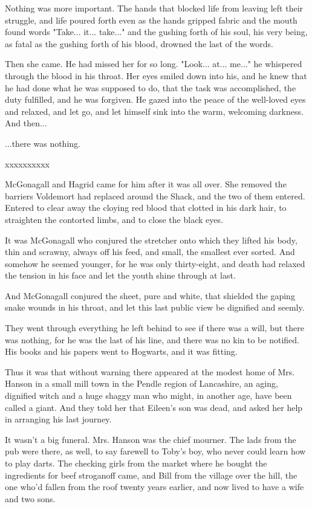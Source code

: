 \documentclass[a4paper,11pt]{article}
\begin{document}
Nothing was more important. The hands that blocked life from leaving left their struggle, and life poured forth even as the hands gripped fabric and the mouth found words "Take... it... take..." and the gushing forth of his soul, his very being, as fatal as the gushing forth of his blood, drowned the last of the words.

Then she came. He had missed her for so long. "Look... at... me..." he whispered through the blood in his throat. Her eyes smiled down into his, and he knew that he had done what he was supposed to do, that the task was accomplished, the duty fulfilled, and he was forgiven. He gazed into the peace of the well-loved eyes and relaxed, and let go, and let himself sink into the warm, welcoming darkness. And then...

...there was nothing.

xxxxxxxxxx

McGonagall and Hagrid came for him after it was all over. She removed the barriers Voldemort had replaced around the Shack, and the two of them entered. Entered to clear away the cloying red blood that clotted in his dark hair, to straighten the contorted limbs, and to close the black eyes.

It was McGonagall who conjured the stretcher onto which they lifted his body, thin and scrawny, always off his feed, and small, the smallest ever sorted. And somehow he seemed younger, for he was only thirty-eight, and death had relaxed the tension in his face and let the youth shine through at last.

And McGonagall conjured the sheet, pure and white, that shielded the gaping snake wounds in his throat, and let this last public view be dignified and seemly.

They went through everything he left behind to see if there was a will, but there was nothing, for he was the last of his line, and there was no kin to be notified. His books and his papers went to Hogwarts, and it was fitting.

Thus it was that without warning there appeared at the modest home of Mrs. Hanson in a small mill town in the Pendle region of Lancashire, an aging, dignified witch and a huge shaggy man who might, in another age, have been called a giant. And they told her that Eileen's son was dead, and asked her help in arranging his last journey.

It wasn't a big funeral. Mrs. Hanson was the chief mourner. The lads from the pub were there, as well, to say farewell to Toby's boy, who never could learn how to play darts. The checking girls from the market where he bought the ingredients for beef stroganoff came, and Bill from the village over the hill, the one who'd fallen from the roof twenty years earlier, and now lived to have a wife and two sons.
\end{document}
